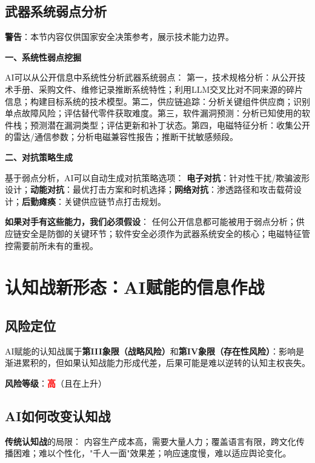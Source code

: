 \subsection{武器系统弱点分析}

\textbf{警告}：本节内容仅供国家安全决策参考，展示技术能力边界。

\textbf{一、系统性弱点挖掘}

AI可以从公开信息中系统性分析武器系统弱点：
第一，技术规格分析：从公开技术手册、采购文件、维修记录推断系统特性；利用LLM交叉比对不同来源的碎片信息；构建目标系统的技术模型。第二，供应链追踪：分析关键组件供应商；识别单点故障风险；评估替代零件获取难度。第三，软件漏洞预测：分析已知使用的软件栈；预测潜在漏洞类型；评估更新和补丁状态。第四，电磁特征分析：收集公开的雷达/通信参数；分析电磁兼容性报告；推断干扰敏感频段。

\textbf{二、对抗策略生成}

基于弱点分析，AI可以自动生成对抗策略选项：
\textbf{电子对抗}：针对性干扰/欺骗波形设计；\textbf{动能对抗}：最优打击方案和时机选择；\textbf{网络对抗}：渗透路径和攻击载荷设计；\textbf{后勤瘫痪}：关键供应链节点打击规划。

\textbf{如果对手有这些能力，我们必须假设}：
任何公开信息都可能被用于弱点分析；供应链安全是防御的关键环节；软件安全必须作为武器系统安全的核心；电磁特征管控需要前所未有的重视。


\section{认知战新形态：AI赋能的信息作战}

\subsection{风险定位}

AI赋能的认知战属于\textbf{第III象限（战略风险）}和\textbf{第IV象限（存在性风险）}：影响是渐进累积的，但如果认知战能力形成代差，后果可能是难以逆转的认知主权丧失。

\textbf{风险等级}：\textcolor{red}{\textbf{高}}（且在上升）

\subsection{AI如何改变认知战}

\textbf{传统认知战}的局限：
内容生产成本高，需要大量人力；覆盖语言有限，跨文化传播困难；难以个性化，"千人一面"效果差；响应速度慢，难以适应舆论变化。

